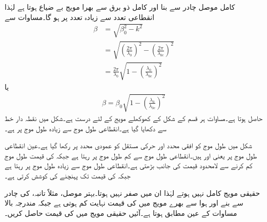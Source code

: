 کامل موصل چادر سے بنا اور کامل ذو برق سے بھرا  مویج بے ضیاع ہوتا ہے لہٰذا انقطاعی تعدد سے زیادہ  تعدد پر  ہو گا۔مساوات  سے 
\begin{align*}
\beta&=\sqrt{\beta_0^2-k^2}\\
&=\sqrt{\left(\frac{2\pi}{\lambda_0}\right)^2-\left(\frac{2\pi}{\lambda_{0c}}\right)^2}\\
&=\frac{2\pi}{\lambda_0}\sqrt{1-\left(\frac{\lambda_0}{\lambda_{0c}}\right)^2}
\end{align*}
یا
\begin{align}\label{مساوات_مویج_زاویائی_مستقل_عمومی_مساوات}
\beta=\beta_0\sqrt{1-\left(\frac{\lambda_0}{\lambda_{0c}}\right)^2}
\end{align}
حاصل ہوتا ہے۔مساوات  ہر قسم کے  شکل کے کھوکھلے مویج کے لئے درست ہے۔شکل  میں نقطہ دار خط سے  دکھایا گیا ہے۔انقطاعی طول موج سے زیادہ طول موج پر  ہے۔

شکل  میں طول موج کو افقی محدد اور حرکی مستقل کو عمودی محدد پر رکھا گیا ہے۔عین انقطاعی طول موج  پر  یعنی  اور  ہیں۔انقطاعی طول موج سے کم طول موج پر  رہتا ہے جبکہ  کی قیمت طول موج کم کرنے سے لامحدود قیمت کی جانب بڑھتی ہے۔انقطاعی طول موج سے زیادہ طول موج پر  رہتا ہے جبکہ  کی قیمت  تک پہنچنے کی کوشش کرتی ہے۔

حقیقی مویج کامل نہیں ہوتے لہٰذا ان میں  صفر نہیں ہوتا۔بہتر موصل، مثلاً تانبہ، کی چادر سے بنے اور ہوا سے بھرے مویج میں  کی قیمت نہایت کم ہوتی ہے جبکہ  مندرجہ بالا مساوات کے عین مطابق ہوتا ہے۔آئیں حقیقی مویج میں  کی قیمت حاصل کریں۔

